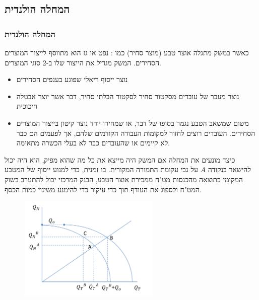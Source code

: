\documentclass[usenames,dvipsnames]{beamer}
\begin{document}
\begin{RTL}
\section{המחלה הולנדית}
\begin{frame}[allowframebreaks]
    \frametitle{המחלה הולנדית}
    כאשר במשק מתגלה אוצר טבע (מוצר סחיר) כמו : נפט או גז הוא מתווסף לייצור המוצרים הסחירים.
    המשק מגדיל את הייצור שלו ב-2 סוגי המוצרים.
    \begin{itemize}
        \item נוצר ייסוף ריאלי שפוגע בענפים הסחירים
        \item נוצר מעבר של עובדים מסקטור סחיר לסקטור הבלתי סחיר, דבר אשר יוצר אבטלה חיכוכית
        \item משום שמשאב הטבע נגמר בסופו של דבר, או שמחירו יורד נוצר קיטון בייצור המוצרים הסחירים. העובדים רוצים לחזור למקומות העבודה הקודמים שלהם, אך לפעמים הם כבר לא קיימים או
        שהעובדים כבר לא בעלי הכשרה מתאימה.
    \end{itemize}
    \framebreak
    \begin{exampleblock}{כיצד מונעים את המחלה}
        אם המשק היה מייצא את כל מה שהוא מפיק, הוא היה יכול להישאר בנקודה $A$ על גבי עקומת
התמורה המקורית. בו זמנית, כדי למנוע ייסוף של המטבע המקומי כתוצאה מהכנסות מט"ח
ממכירת אוצר הטבע, הבנק המרכזי יכול להתערב בשוק המט"ח ולספוג את העודף תוך כדי עיקור
כדי להימנע משינוי כמות הכסף.
    \end{exampleblock}
    \begin{figure}[ht]
        \centering
        \includegraphics[width=0.6\textwidth]{TNT3.png}

    \end{figure}
\end{frame}
\end{RTL}
\end{document}
